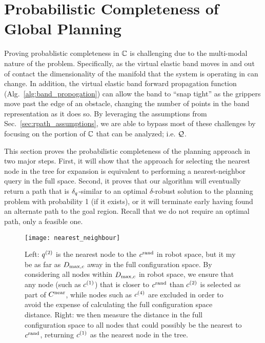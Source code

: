 \section{Probabilistic Completeness of Global Planning}
\label{sec:analysis}



Proving probablistic completeness in $\mathbb{C}$ is challenging due to the multi-modal nature of the problem. Specifically, as the virtual elastic band moves in and out of contact the dimensionality of the manifold that the system is operating in can change. In addition, the virtual elastic band forward propagation function (Alg.~\ref{alg:band_propogation}) can allow the band to ``snap tight'' as the grippers move past the edge of an obstacle, changing the number of points in the band representation as it does so. By leveraging the assumptions from Sec.~\ref{sec:rpath_assumptions}, we are able to bypass most of these challenges by focusing on the portion of $\mathbb{C}$ that can be analyzed; i.e. $\mathcal{Q}$.



This section proves the probabilistic completeness of the planning approach in two major steps.  First, it will show that the approach for selecting the nearest node in the tree for expansion is equivalent to performing a nearest-neighbor query in the full space.  Second, it proves that our algorithm will eventually return a path that is $\delta_q$-similar to an optimal $\delta$-robust solution to the planning problem with probability 1 (if it exists), or it will terminate early having found an alternate path to the goal region. Recall that we do not require an optimal path, only a feasible one.


\begin{figure}
    \centering
    \texttt{[image: nearest\_neighbour]}
    \caption{Left: $q^{(2)}$ is the nearest node to the $c^\textrm{rand}$ in robot space, but it my be as far as $D_{\textrm{max},c}$ away in the full configuration space. By considering all nodes within $D_{\textrm{max},c}$ in robot space, we ensure that any node (such as $c^{(1)}$) that is closer to $c^\textrm{rand}$ than $c^{(2)}$ is selected as part of $C^{\textrm{near}}$, while nodes such as $c^{(4)}$ are excluded in order to avoid the expense of calculating the full configuration space distance. Right: we then measure the distance in the full configuration space to all nodes that could possibly be the nearest to $c^\textrm{rand}$, returning $c^{(1)}$ as the nearest node in the tree.}
    \label{fig:nearest}
\end{figure}






